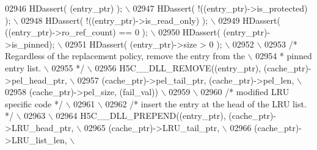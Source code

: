 \begin{DoxyCode}
02946 \textcolor{preprocessor}{    HDassert( (entry\_ptr) );                                           \(\backslash\)}
02947 \textcolor{preprocessor}{    HDassert( !((entry\_ptr)->is\_protected) );                          \(\backslash\)}
02948 \textcolor{preprocessor}{    HDassert( !((entry\_ptr)->is\_read\_only) );                          \(\backslash\)}
02949 \textcolor{preprocessor}{    HDassert( ((entry\_ptr)->ro\_ref\_count) == 0 );                      \(\backslash\)}
02950 \textcolor{preprocessor}{    HDassert( (entry\_ptr)->is\_pinned);                                 \(\backslash\)}
02951 \textcolor{preprocessor}{    HDassert( (entry\_ptr)->size > 0 );                                 \(\backslash\)}
02952 \textcolor{preprocessor}{                                                                       \(\backslash\)}
02953 \textcolor{preprocessor}{    }\textcolor{comment}{/* Regardless of the replacement policy, remove the entry from the \(\backslash\)}
02954 \textcolor{comment}{     * pinned entry list.                                              \(\backslash\)}
02955 \textcolor{comment}{     */}\textcolor{preprocessor}{                                                                \(\backslash\)}
02956 \textcolor{preprocessor}{    H5C\_\_DLL\_REMOVE((entry\_ptr), (cache\_ptr)->pel\_head\_ptr,            \(\backslash\)}
02957 \textcolor{preprocessor}{                    (cache\_ptr)->pel\_tail\_ptr, (cache\_ptr)->pel\_len,   \(\backslash\)}
02958 \textcolor{preprocessor}{                    (cache\_ptr)->pel\_size, (fail\_val))                 \(\backslash\)}
02959 \textcolor{preprocessor}{                                                                       \(\backslash\)}
02960 \textcolor{preprocessor}{    }\textcolor{comment}{/* modified LRU specific code */}\textcolor{preprocessor}{                                   \(\backslash\)}
02961 \textcolor{preprocessor}{                                                                       \(\backslash\)}
02962 \textcolor{preprocessor}{    }\textcolor{comment}{/* insert the entry at the head of the LRU list. */}\textcolor{preprocessor}{                \(\backslash\)}
02963 \textcolor{preprocessor}{                                                                       \(\backslash\)}
02964 \textcolor{preprocessor}{    H5C\_\_DLL\_PREPEND((entry\_ptr), (cache\_ptr)->LRU\_head\_ptr,           \(\backslash\)}
02965 \textcolor{preprocessor}{                     (cache\_ptr)->LRU\_tail\_ptr,                        \(\backslash\)}
02966 \textcolor{preprocessor}{                     (cache\_ptr)->LRU\_list\_len,                        \(\backslash\)}

\end{DoxyCode}
